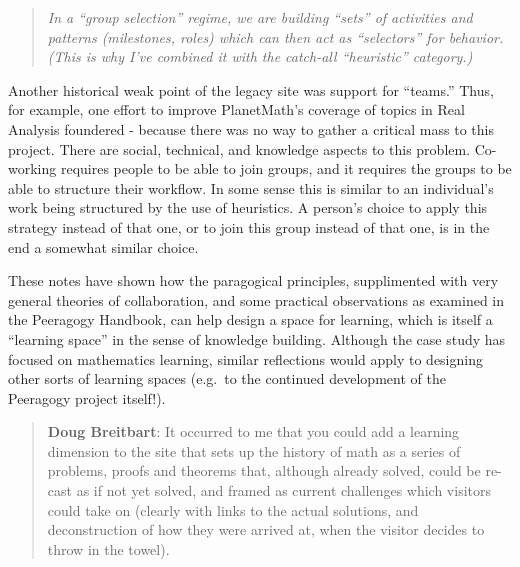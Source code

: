 \begin{quote}
\emph{In a ``group selection'' regime, we are building ``sets'' of
activities and patterns (milestones, roles) which can then act as
``selectors'' for behavior. (This is why I've combined it with the
catch-all ``heuristic'' category.)}
\end{quote}
Another historical weak point of the legacy site was support for
``teams.'' Thus, for example, one effort to improve PlanetMath's
coverage of topics in Real Analysis foundered - because there was no way
to gather a critical mass to this project. There are social, technical,
and knowledge aspects to this problem. Co-working requires people to be
able to join groups, and it requires the groups to be able to structure
their workflow. In some sense this is similar to an individual's work
being structured by the use of heuristics. A person's choice to apply
this strategy instead of that one, or to join this group instead of that
one, is in the end a somewhat similar choice.

These notes have shown how the paragogical principles, supplimented with
very general theories of collaboration, and some practical observations
as examined in the Peeragogy Handbook, can help design a space for
learning, which is itself a ``learning space'' in the sense of knowledge
building. Although the case study has focused on mathematics learning,
similar reflections would apply to designing other sorts of learning
spaces (e.g.~to the continued development of the Peeragogy project
itself!).

\begin{quote}
\textbf{Doug Breitbart}: It occurred to me that you could add a learning
dimension to the site that sets up the history of math as a series of
problems, proofs and theorems that, although already solved, could be
re-cast as if not yet solved, and framed as current challenges which
visitors could take on (clearly with links to the actual solutions, and
deconstruction of how they were arrived at, when the visitor decides to
throw in the towel).
\end{quote}

